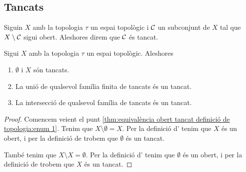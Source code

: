 \documentclass[../Apunts.tex]{subfiles}
\begin{document}
	\subsection{Tancats}
	\begin{definition}[Tancat]
		\label{def:tancat}
		Siguin \(X\) amb la topologia \(\tau\) un espai topològic i \(\mathcal{C}\) un subconjunt de \(X\) tal que \(X\setminus\mathcal{C}\) sigui obert. Aleshores direm que \(\mathcal{C}\) és tancat.
	\end{definition}
	\begin{theorem}
		\label{thm:equivalència obert tancat definició de topologia}
		Sigui \(X\) amb la topologia \(\tau\) un espai topològic. Aleshores
		\begin{enumerate}
			\item\label{thm:equivalència obert tancat definició de topologia:enum 1} \(\emptyset\) i \(X\) són tancats.
			\item\label{thm:equivalència obert tancat definició de topologia:enum 2} La unió de qualsevol família finita de tancats és un tancat.
			\item\label{thm:equivalència obert tancat definició de topologia:enum 3} La intersecció de qualsevol família de tancats és un tancat.
		\end{enumerate}
		\begin{proof}
			Comencem veient el punt \eqref{thm:equivalència obert tancat definició de topologia:enum 1}. Tenim que \(X\setminus\emptyset=X\). Per la definició d' tenim que \(X\) és un obert, i per la definició de  trobem que \(\emptyset\) és un tancat.
			
			També tenim que \(X\setminus X=\emptyset\). Per la definició d' tenim que \(\emptyset\) és un obert, i per la definició de  trobem que \(X\) és un tancat.
			

\end{proof}
\end{theorem}
\end{document}
